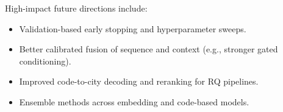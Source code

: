 \documentclass[11pt]{article}
\begin{document}
High-impact future directions include:
\begin{itemize}[leftmargin=1.5em]
    \item Validation-based early stopping and hyperparameter sweeps.
    \item Better calibrated fusion of sequence and context (e.g., stronger gated conditioning).
    \item Improved code-to-city decoding and reranking for RQ pipelines.
    \item Ensemble methods across embedding and code-based models.
\end{itemize}
\end{document}
